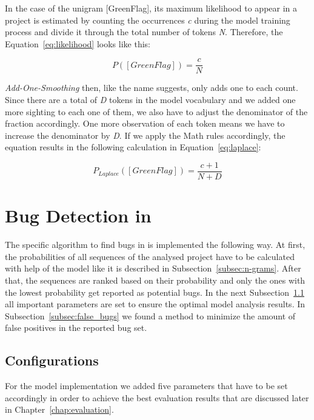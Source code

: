 In the case of the unigram [GreenFlag], its maximum likelihood to appear in a \scratch{} project is estimated by counting the occurrences \textit{c} during the model training process and divide it through the total number of tokens \textit{N}. Therefore, the Equation~\ref{eq:likelihood} looks like this:

\begin{equation} \label{eq:likelihood}
P([GreenFlag]) ={} \frac{c}{N}
\end{equation}

\textit{Add-One-Smoothing} then, like the name suggests, only adds one to each count. Since there are a total of \textit{D} tokens in the model vocabulary and we added one more sighting to each one of them, we also have to adjust the denominator of the fraction accordingly. One more observation of each token means we have to increase the denominator by \textit{D}. If we apply the Math rules accordingly, the equation results in the following calculation in Equation~\ref{eq:laplace}:

\begin{equation} \label{eq:laplace}
P_{Laplace}([GreenFlag]) ={} \frac{c + 1}{N + D}
\end{equation}


\section{Bug Detection in \scratch{}}\label{sec:detection}
The specific algorithm to find bugs in \scratch{} is implemented the following way. At first, the probabilities of all sequences of the analysed project have to be calculated with help of the model like it is described in Subsection~\ref{subsec:n-grams}. After that, the sequences are ranked based on their probability and only the ones with the lowest probability get reported as potential bugs. In the next Subsection~\ref{subsec:configurations} all important parameters are set to ensure the optimal model analysis results. In Subsection~\ref{subsec:false_bugs} we found a method to minimize the amount of false positives in the reported bug set.

\subsection{Configurations}\label{subsec:configurations}
For the \scratch{} model implementation we added five parameters that have to be set accordingly in order to achieve the best evaluation results that are discussed later in Chapter~\ref{chap:evaluation}.

